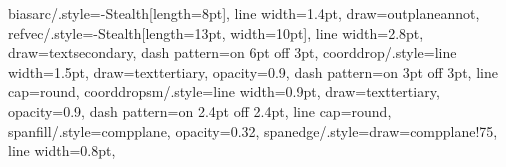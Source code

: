 {  biasarc/.style={-{Stealth[length=8pt]}, line width=1.4pt, draw=outplaneannot},
  refvec/.style={-{Stealth[length=13pt, width=10pt]}, line width=2.8pt, draw=textsecondary,
    dash pattern=on 6pt off 3pt},
  coorddrop/.style={line width=1.5pt, draw=texttertiary, opacity=0.9,
    dash pattern=on 3pt off 3pt, line cap=round},
  coorddropsm/.style={line width=0.9pt, draw=texttertiary, opacity=0.9,
    dash pattern=on 2.4pt off 2.4pt, line cap=round},
  spanfill/.style={compplane, opacity=0.32},
  spanedge/.style={draw=compplane!75, line width=0.8pt},
}

